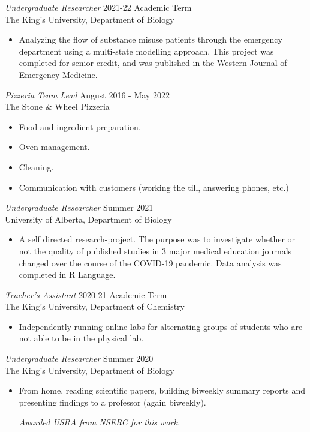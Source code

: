 \documentclass[margin, 10pt]{res} %
\begin{document}
\begin{resume}
{\sl Undergraduate Researcher} \hfill 2021-22 Academic Term \\
The King's University, Department of Biology
\begin{itemize}
\item Analyzing the flow of substance misuse patients through the emergency department using a multi-state modelling approach. This project was completed for senior credit, and was \href{https://escholarship.org/uc/item/8x79h4xz}{published} in the Western Journal of Emergency Medicine. 
\end{itemize}

{\sl Pizzeria Team Lead} \hfill August 2016 - May 2022 \\
The Stone \& Wheel Pizzeria

\begin{itemize} \itemsep -2pt %
\item Food and ingredient preparation.
\item Oven management.
\item Cleaning.
\item Communication with customers (working the till, answering phones, etc.)
\end{itemize}

{\sl Undergraduate Researcher} \hfill Summer 2021 \\
University of Alberta, Department of Biology
\begin{itemize}
\item A self directed research-project. The purpose was to investigate whether or not the quality of published studies in 3 major medical education journals changed over the course of the COVID-19 pandemic. Data analysis was completed in R Language.
\end{itemize}

{\sl Teacher's Assistant} \hfill 2020-21 Academic Term \\
The King's University, Department of Chemistry
\begin{itemize}
\item Independently running online labs for alternating groups of students who are not able to be in the physical lab.
\end{itemize}

{\sl Undergraduate Researcher} \hfill Summer 2020 \\
The King's University, Department of Biology
\begin{itemize}
\item From home, reading scientific papers, building biweekly summary reports and presenting findings to a professor (again biweekly).
\par
\small{\textit{Awarded USRA from NSERC for this work.}}
\end{itemize}


\end{resume}
\end{document}
